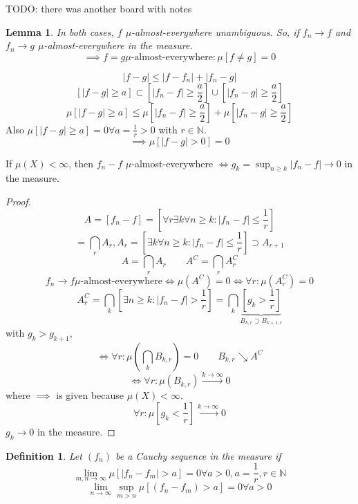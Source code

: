 \documentclass[a4paper]{article}
\newcounter{lecref}[section]
\numberwithin{lecref}{section}
\theoremstyle{break}
\newtheorem{definition}[lecref]{Definition}
\newtheorem{lemma}[lecref]{Lemma}
\newcommand{\Abs}[1]{\left|#1\right|}
\begin{document}
TODO: there was another board with notes

\begin{lemma}
  In both cases, $f$ $\mu$-almost-everywhere unambiguous. So, if $f_n \to f$ and $f_n \to g$ $\mu$-almost-everywhere in the measure.
  \[ \implies f = g \mu\text{-almost-everywhere}: \mu[f \neq g] = 0 \]
\end{lemma}

\[ \Abs{f - g} \leq \Abs{f - f_n} + \Abs{f_n - g} \]
\[ \left[\Abs{f - g} \geq a\right] \subset \left[\Abs{f_n - f} \geq \frac a2\right] \cup \left[\Abs{f_n - g} \geq \frac a2\right] \]
\[ \mu\left[\Abs{f - g} \geq a\right] \leq \mu\left[\Abs{f_n - f} \geq \frac a2\right] + \mu\left[\Abs{f_n - g} \geq \frac a2\right] \]
Also $\mu[\Abs{f - g} \geq a] = 0 \forall a = \frac 1r > 0$ with $r \in \mathbb N$.
\[ \implies \mu[\Abs{f - g} > 0] = 0 \]

\begin{theorem}
  If $\mu(X) < \infty$, then $f_n - f$ $\mu$-almost-everywhere $\iff g_k = \sup_{n \geq k} \Abs{f_n - f} \to 0$ in the measure.
\end{theorem}

\begin{proof}
  \[ A = [f_n - f] = \left[\forall r \exists k \forall n \geq k: \Abs{f_n - f} \leq \frac 1r\right] \]
  \[ = \bigcap_r A_r, A_r = \left[\exists k \forall n \geq k: \Abs{f_n - f} \leq \frac 1r\right] \supset A_{r+1} \]
  \[ A = \bigcap_r A_r \qquad A^C = \bigcap_r A_r^C \]
  \[ f_n \to f \mu\text{-almost-everywhere} \iff \mu(A^C) = 0 \iff \forall r: \mu(A_r^C) = 0 \]
  \[ A_r^C = \bigcap_k \left[\exists n \geq k: \Abs{f_n - f} > \frac 1r\right] = \bigcap_k \underbrace{\left[g_k > \frac 1r\right]}_{B_{k,r} \supset B_{k+1,r}} \]
  with $g_k > g_{k+1}$,
  \[ \iff \forall r: \mu\left(\bigcap_k B_{k,r}\right) = 0 \qquad B_{k,r} \searrow A^C \]
  \[ \iff \forall r: \mu(B_{k,r}) \xrightarrow{k\to\infty} 0 \]
  where $\implies$ is given because $\mu(X) < \infty$.
  \[ \forall r: \mu\left[g_k < \frac 1r\right] \xrightarrow{k \to \infty} 0 \]
  $g_k \to 0$ in the measure.
\end{proof}

\begin{definition}
  Let $(f_n)$ be a Cauchy sequence in the measure if
  \[ \lim_{m,n \to \infty} \mu\left[\Abs{f_n - f_m} > a\right] = 0 \forall a > 0, a = \frac 1r, r \in \mathbb N \]
  \[ \lim_{n \to \infty} \sup_{m > n} \mu\left[\left(f_n - f_m\right) > a\right] = 0 \forall a > 0 \]
\end{definition}
\end{document}
